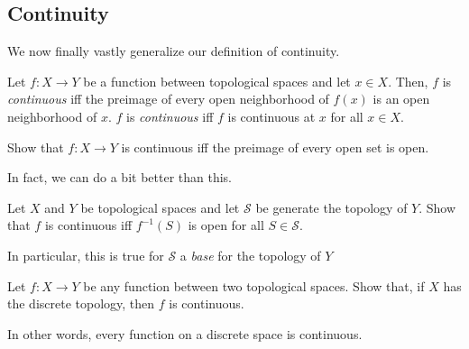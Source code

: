 \subsection{Continuity}

We now finally vastly generalize our definition of continuity.
\begin{dfn}
Let $f:X\rightarrow Y$ be a function between topological spaces and let $x\in X$.  Then, $f$ is \emph{continuous} iff the preimage of every open neighborhood of $f(x)$ is an open neighborhood of $x$.  $f$ is \emph{continuous} iff $f$ is continuous at $x$ for all $x\in X$.
\end{dfn}
\begin{exr}
Show that $f:X\rightarrow Y$ is continuous iff the preimage of every open set is open.
\end{exr}
In fact, we can do a bit better than this.
\begin{exr}\label{exr4.1.27}
Let $X$ and $Y$ be topological spaces and let $\mathcal{S}$ be generate the topology of $Y$.  Show that $f$ is continuous iff $f^{-1}(S)$ is open for all $S\in \mathcal{S}$.
\begin{rmk}
In particular, this is true for $\mathcal{S}$ a \emph{base} for the topology of $Y$
\end{rmk}
\end{exr}
\begin{exr}
Let $f:X\rightarrow Y$ be any function between two topological spaces.  Show that, if $X$ has the discrete topology, then $f$ is continuous.
\begin{rmk}
In other words, every function on a discrete space is continuous.
\end{rmk}
\end{exr}

